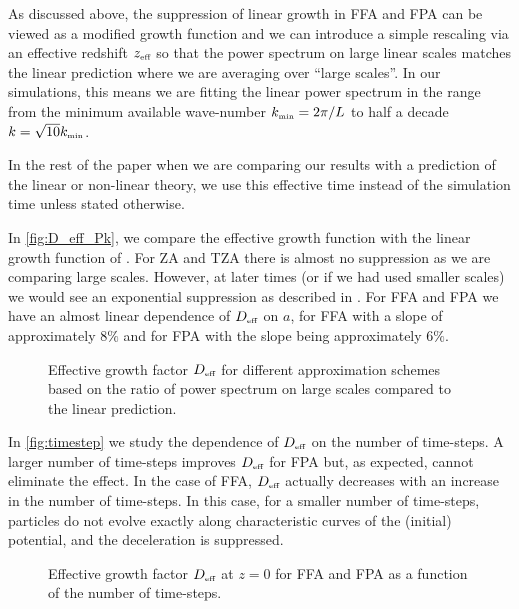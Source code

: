 As discussed above, the suppression of linear growth in FFA and FPA can be viewed as a modified growth function and we can introduce a simple rescaling via an effective redshift $z_\text{\tiny eff}$ so that the power spectrum on large linear scales matches the linear prediction
where we are averaging over ``large scales''. In our simulations, this means we are fitting the linear power spectrum in the range from the minimum available wave-number $k_\text{\tiny min}=2\pi/L$ to half a decade $k=\sqrt{10}k_\text{\tiny min}$.

In the rest of the paper when we are comparing our results with a prediction of the linear or non-linear theory, we use this effective time instead of the simulation time unless stated otherwise.

In \autoref{fig:D_eff_Pk}, we compare the effective growth function with the linear growth function of \LCDM. For ZA and TZA there is almost no suppression as we are comparing large scales. However, at later times (or if we had used smaller scales) we would see an exponential suppression as described in \cite{Bharadwaj_1996}. For FFA and FPA we have an almost linear dependence of $D_\text{\tiny eff}$ on $a$, for FFA with a slope of approximately $8\%$ and for FPA with the slope being approximately $6\%$.
\begin{figure}[!bt]
  \centering
    \begin{subfigure}{0.9\textwidth}
	\end{subfigure}
	\begin{subfigure}{0.9\textwidth}
	\end{subfigure}
  \caption{Effective growth factor $D_\text{\tiny eff}$ for different approximation schemes based on the ratio of power spectrum on large scales compared to the linear prediction.}
  \label{fig:D_eff_Pk}
\end{figure}

In \autoref{fig:timestep} we study the dependence of $D_\text{\tiny eff}$ on the number of time-steps. A larger number of time-steps improves $D_\text{\tiny eff}$ for FPA but, as expected, cannot eliminate the effect. In the case of FFA, $D_\text{\tiny eff}$ actually decreases with an increase in the number of time-steps. In this case, for a smaller number of time-steps, particles do not evolve exactly along characteristic curves of the (initial) potential, and the deceleration is suppressed.
\begin{figure}[!bt]
  \centering
    \begin{subfigure}{0.9\textwidth}
	\end{subfigure}
	\begin{subfigure}{0.9\textwidth}
	\end{subfigure}
  \caption{Effective growth factor $D_\text{\tiny eff}$ at $z=0$ for FFA and FPA as a function of the number of time-steps.}
  \label{fig:timestep}
\end{figure}

